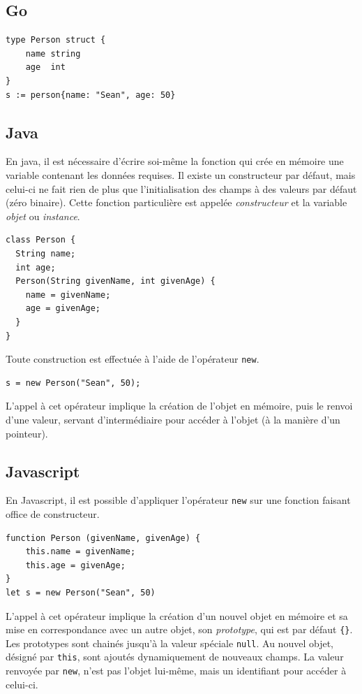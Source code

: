 \documentclass[a4paper,francais]{insalyon}
\begin{document}
\subsection{Go}

\begin{verbatim}
type Person struct {
    name string
    age  int
}    
s := person{name: "Sean", age: 50}
\end{verbatim}

\subsection{Java}

En java, il est nécessaire d'écrire soi-même la fonction qui crée en mémoire une variable contenant les données requises. Il existe un constructeur par défaut, mais celui-ci ne fait rien de plus que l'initialisation des champs à des valeurs par défaut (zéro binaire). Cette fonction particulière est appelée \emph{constructeur} et la variable \emph{objet} ou \emph{instance}. 
\begin{verbatim}
class Person {
  String name; 
  int age; 
  Person(String givenName, int givenAge) {
    name = givenName;
    age = givenAge;
  }
}
\end{verbatim}

Toute construction est effectuée à l'aide de l'opérateur \texttt{new}.  
\begin{verbatim}
s = new Person("Sean", 50);  
\end{verbatim}

L'appel à cet opérateur implique la création de l'objet en mémoire, puis le renvoi d'une valeur, servant d'intermédiaire pour accéder à l'objet (à la manière d'un pointeur).

\subsection{Javascript}

En Javascript, il est possible d'appliquer l'opérateur \texttt{new} sur une fonction faisant office de constructeur.
\begin{verbatim}
function Person (givenName, givenAge) {
    this.name = givenName; 
    this.age = givenAge; 
}
let s = new Person("Sean", 50)
\end{verbatim}
L'appel à cet opérateur implique la création d'un nouvel objet en mémoire et sa mise en correspondance avec un autre objet, son \emph{prototype}, qui est par défaut \verb!{}!. Les prototypes sont chainés jusqu'à la valeur spéciale \texttt{null}. Au nouvel objet, désigné par \texttt{this}, sont ajoutés dynamiquement de nouveaux champs. La valeur renvoyée par \texttt{new}, n'est pas l'objet lui-même, mais un identifiant pour accéder à celui-ci.
\end{document}
